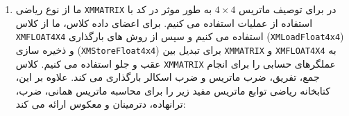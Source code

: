 {\begin{spacing}{1.5}
\begin{enumerate}[label=\textbf{\arabic*}.]
            \item {ما از نوع ریاضی \texttt{XMMATRIX} در  برای توصیف ماتریس $4\times 4$ به طور موثر در کد با استفاده از عملیات  استفاده می کنیم.
            برای اعضای داده کلاس، ما از کلاس \texttt{XMFLOAT4X4} استفاده می کنیم و
            سپس از روش های بارگذاری (\texttt{XMLoadFloat4x4}) و ذخیره سازی (\texttt{XMStoreFloat4x4}) برای تبدیل بین \texttt{XMMATRIX} و \texttt{XMFLOAT4X4} به عقب و جلو استفاده می کنیم.
            کلاس \texttt{XMMATRIX} عملگرهای حسابی را برای انجام جمع، تفریق، ضرب ماتریس و ضرب اسکالر بارگذاری می کند.
            علاوه بر این، کتابخانه ریاضی  توابع ماتریس مفید زیر را برای محاسبه ماتریس همانی، ضرب، ترانهاده، دترمینان و معکوس ارائه می کند:
            \textbf{\vspace{6pt}}
            \lr{}
            }
        \end{enumerate}
    \end{spacing}
}
\newpage



